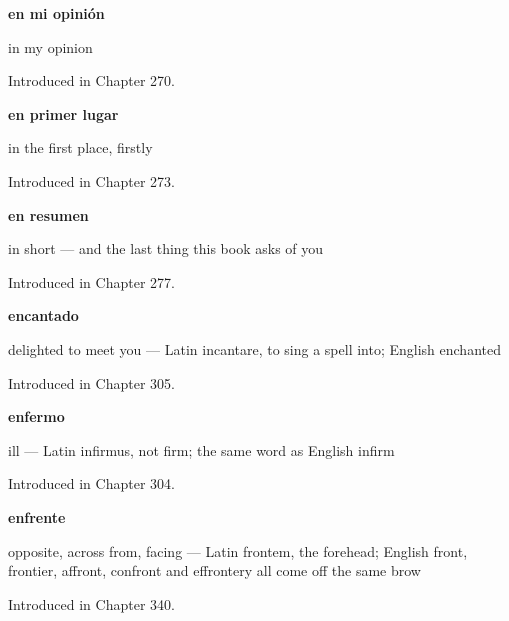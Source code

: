 \noindent\begin{minipage}[t]{\linewidth}
\raggedright
\textbf{en mi opinión}\par
\small in my opinion\par
\footnotesize Introduced in Chapter 270.
\end{minipage}\par\medskip

\noindent\begin{minipage}[t]{\linewidth}
\raggedright
\textbf{en primer lugar}\par
\small in the first place, firstly\par
\footnotesize Introduced in Chapter 273.
\end{minipage}\par\medskip

\noindent\begin{minipage}[t]{\linewidth}
\raggedright
\textbf{en resumen}\par
\small in short — and the last thing this book asks of you\par
\footnotesize Introduced in Chapter 277.
\end{minipage}\par\medskip

\noindent\begin{minipage}[t]{\linewidth}
\raggedright
\textbf{encantado}\par
\small delighted to meet you — Latin incantare, to sing a spell into; English enchanted\par
\footnotesize Introduced in Chapter 305.
\end{minipage}\par\medskip

\noindent\begin{minipage}[t]{\linewidth}
\raggedright
\textbf{enfermo}\par
\small ill — Latin infirmus, not firm; the same word as English infirm\par
\footnotesize Introduced in Chapter 304.
\end{minipage}\par\medskip

\noindent\begin{minipage}[t]{\linewidth}
\raggedright
\textbf{enfrente}\par
\small opposite, across from, facing — Latin frontem, the forehead; English front, frontier, affront, confront and effrontery all come off the same brow\par
\footnotesize Introduced in Chapter 340.
\end{minipage}\par\medskip

